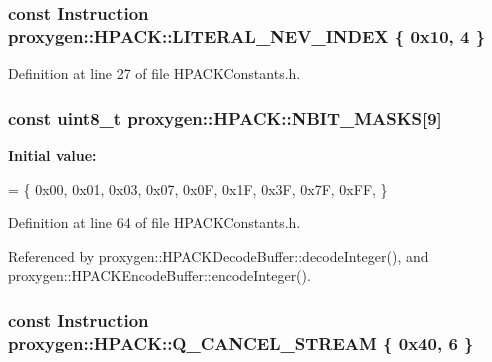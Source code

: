 \subsubsection[{L\+I\+T\+E\+R\+A\+L\+\_\+\+N\+E\+V\+\_\+\+I\+N\+D\+EX}]{\setlength{\rightskip}{0pt plus 5cm}const {\bf Instruction} proxygen\+::\+H\+P\+A\+C\+K\+::\+L\+I\+T\+E\+R\+A\+L\+\_\+\+N\+E\+V\+\_\+\+I\+N\+D\+EX \{ 0x10, 4 \}}\label{namespaceproxygen_1_1HPACK_ae5296b3c5b4f124204185796b408a232}


Definition at line 27 of file H\+P\+A\+C\+K\+Constants.\+h.

\subsubsection[{N\+B\+I\+T\+\_\+\+M\+A\+S\+KS}]{\setlength{\rightskip}{0pt plus 5cm}const uint8\+\_\+t proxygen\+::\+H\+P\+A\+C\+K\+::\+N\+B\+I\+T\+\_\+\+M\+A\+S\+KS[9]}\label{namespaceproxygen_1_1HPACK_a02303728e71ad2741c07ba31adacf3ce}
{\bfseries Initial value\+:}
\begin{DoxyCode}
= \{
  0x00,  
  0x01,  
  0x03,  
  0x07,  
  0x0F,  
  0x1F,  
  0x3F,  
  0x7F,  
  0xFF,  
\}
\end{DoxyCode}


Definition at line 64 of file H\+P\+A\+C\+K\+Constants.\+h.



Referenced by proxygen\+::\+H\+P\+A\+C\+K\+Decode\+Buffer\+::decode\+Integer(), and proxygen\+::\+H\+P\+A\+C\+K\+Encode\+Buffer\+::encode\+Integer().

\subsubsection[{Q\+\_\+\+C\+A\+N\+C\+E\+L\+\_\+\+S\+T\+R\+E\+AM}]{\setlength{\rightskip}{0pt plus 5cm}const {\bf Instruction} proxygen\+::\+H\+P\+A\+C\+K\+::\+Q\+\_\+\+C\+A\+N\+C\+E\+L\+\_\+\+S\+T\+R\+E\+AM \{ 0x40, 6 \}}\label{namespaceproxygen_1_1HPACK_ad9edbda628d8e28997a4fe0f25a38636}


